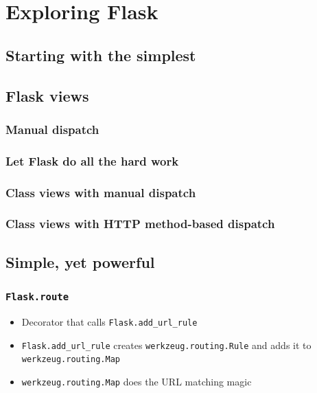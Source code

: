 \documentclass[14pt]{beamer}
\begin{document}
\section{Exploring Flask}

\subsection{Starting with the simplest}

\begin{frame}[fragile]
\end{frame}

\subsection{Flask views}

\begin{frame}
  \frametitle{Manual dispatch}
  
\end{frame}

\begin{frame}
  \frametitle{Let Flask do all the hard work}
  
\end{frame}

\begin{frame}
  \frametitle{Class views with manual dispatch}
  
\end{frame}

\begin{frame}
  \frametitle{Class views with HTTP method-based dispatch}
  
\end{frame}

\subsection{Simple, yet powerful}

\begin{frame}
  \frametitle{\texttt{Flask.route}}
  \begin{itemize}
  \item Decorator that calls \texttt{Flask.add\_url\_rule}
  \item \texttt{Flask.add\_url\_rule} creates \texttt{werkzeug.routing.Rule}
    and adds it to \texttt{werkzeug.routing.Map}
  \item \texttt{werkzeug.routing.Map} does the URL matching magic
  \end{itemize}
\end{frame}
\end{document}
